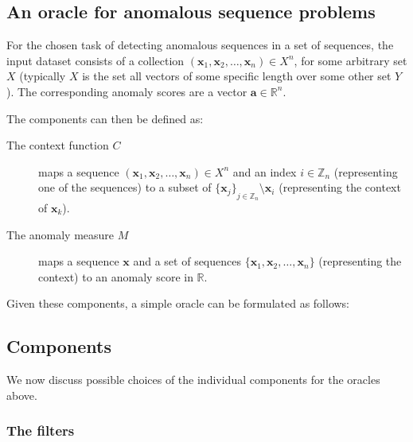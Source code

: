 \subsection{An oracle for anomalous sequence problems}

For the chosen task of detecting anomalous sequences in a set of sequences, the input dataset consists of a collection $(\mathbf{x}_1, \mathbf{x}_2, \dots, \mathbf{x}_n) \in X^n$, for some arbitrary set $X$ (typically $X$ is the set all vectors of some specific length over some other set $Y$). The corresponding anomaly scores are a vector $\mathbf{a} \in \mathbb{R}^n$.

The components can then be defined as:
\begin{description}
    \item[The context function $C$] maps a sequence $(\mathbf{x}_1, \mathbf{x}_2, \dots, \mathbf{x}_n) \in X^n$ and an index $i \in \mathbb{Z}_n$ (representing one of the sequences) to a subset of ${\{\mathbf{x}_j\}}_{j \in \mathbb{Z}_n} \setminus \mathbf{x}_i$ (representing the context of $\mathbf{x}_k$).
    \item[The anomaly measure $M$] maps a sequence $\mathbf{x}$ and a set of sequences $\{\mathbf{x}_1, \mathbf{x}_2, \dots, \mathbf{x}_n\}$ (representing the context) to an anomaly score in $\mathbb{R}$.
\end{description}

Given these components, a simple oracle can be formulated as follows:
\begin{algorithmic}
     
    \EndFor{}
\end{algorithmic}

\subsection{Components}
\label{sect:deriving_problems}

We now discuss possible choices of the individual components for the oracles above.

\subsubsection{The filters}

